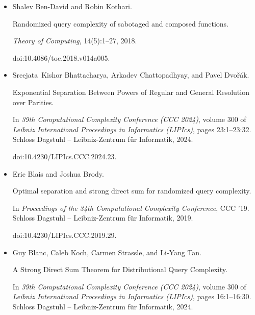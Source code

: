 \documentclass[10pt,a4paper]{article}
\begin{document}
\begin{itemize}
doi:10.4230/LIPIcs.APPROX/RANDOM.2020.28.





\item[] 
[10]

Shalev Ben-David and Robin Kothari.


Randomized query complexity of sabotaged and composed functions.


\emph{Theory of Computing}, 14(5):1–27, 2018.


doi:10.4086/toc.2018.v014a005.





\item[] 
[11]

Sreejata Kishor Bhattacharya, Arkadev Chattopadhyay, and Pavel Dvořák.


Exponential Separation Between Powers of Regular and General
Resolution over Parities.


In \emph{39th Computational Complexity Conference (CCC 2024)}, volume
300 of \emph{Leibniz International Proceedings in Informatics (LIPIcs)}, pages
23:1–23:32. Schloss Dagstuhl – Leibniz-Zentrum für Informatik, 2024.


doi:10.4230/LIPIcs.CCC.2024.23.





\item[] 
[12]

Eric Blais and Joshua Brody.


Optimal separation and strong direct sum for randomized query
complexity.


In \emph{Proceedings of the 34th Computational Complexity Conference},
CCC ’19. Schloss Dagstuhl – Leibniz-Zentrum für Informatik, 2019.


doi:10.4230/LIPIcs.CCC.2019.29.





\item[] 
[13]

Guy Blanc, Caleb Koch, Carmen Strassle, and Li-Yang Tan.


A Strong Direct Sum Theorem for Distributional Query Complexity.


In \emph{39th Computational Complexity Conference (CCC 2024)}, volume
300 of \emph{Leibniz International Proceedings in Informatics (LIPIcs)}, pages
16:1–16:30. Schloss Dagstuhl – Leibniz-Zentrum für Informatik, 2024.



\end{itemize}
\end{document}
